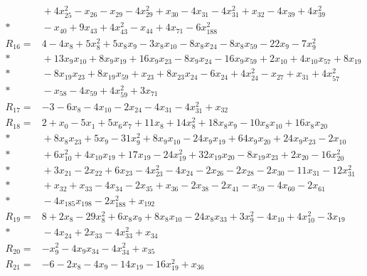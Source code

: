 \documentclass[11pt]{article}
\theoremstyle{remark}\newtheorem{remark}[theorem]{Remark}
\begin{document}
\begin{align*}
&{} + 4x_{25}^{2} - x_{26} - x_{29} - 4x_{29}^{2} + x_{30} - 4x_{31} - 4x_{31}^{2} + x_{32} - 4x_{39} + 4x_{39}^{2} \\*
&{} - x_{40} + 9x_{43} + 4x_{43}^{2} - x_{44} + 4x_{71} - 6x_{188}^{2} \\[4pt]
R_{16} ={}& 4 - 4x_{8} + 5x_{8}^{2} + 5x_{8}x_{9} - 3x_{8}x_{10} - 8x_{8}x_{24} - 8x_{8}x_{59} - 22x_{9} - 7x_{9}^{2} \\*
&{} + 13x_{9}x_{10} + 8x_{9}x_{19} + 16x_{9}x_{23} - 8x_{9}x_{24} - 16x_{9}x_{59} + 2x_{10} + 4x_{10}x_{57} + 8x_{19} \\*
&{} - 8x_{19}x_{23} + 8x_{19}x_{59} + x_{23} + 8x_{23}x_{24} - 6x_{24} + 4x_{24}^{2} - x_{27} + x_{31} + 4x_{57}^{2} \\*
&{} - x_{58} - 4x_{59} + 4x_{59}^{2} + 3x_{71} \\[4pt]
R_{17} ={}& -3 - 6x_{8} - 4x_{10} - 2x_{24} - 4x_{31} - 4x_{31}^{2} + x_{32} \\[4pt]
R_{18} ={}& 2 + x_{0} - 5x_{1} + 5x_{6}x_{7} + 11x_{8} + 14x_{8}^{2} + 18x_{8}x_{9} - 10x_{8}x_{10} + 16x_{8}x_{20} \\*
&{} + 8x_{8}x_{23} + 5x_{9} - 31x_{9}^{2} + 8x_{9}x_{10} - 24x_{9}x_{19} + 64x_{9}x_{20} + 24x_{9}x_{23} - 2x_{10} \\*
&{} + 6x_{10}^{2} + 4x_{10}x_{19} + 17x_{19} - 24x_{19}^{2} + 32x_{19}x_{20} - 8x_{19}x_{23} + 2x_{20} - 16x_{20}^{2} \\*
&{} + 3x_{21} - 2x_{22} + 6x_{23} - 4x_{23}^{2} - 4x_{24} - 2x_{26} - 2x_{28} - 2x_{30} - 11x_{31} - 12x_{31}^{2} \\*
&{} + x_{32} + x_{33} - 4x_{34} - 2x_{35} + x_{36} - 2x_{38} - 2x_{41} - x_{59} - 4x_{60} - 2x_{61} \\*
&{} - 4x_{185}x_{198} - 2x_{188}^{2} + x_{192} \\[4pt]
R_{19} ={}& 8 + 2x_{8} - 29x_{8}^{2} + 6x_{8}x_{9} + 8x_{8}x_{10} - 24x_{8}x_{33} + 3x_{9}^{2} - 4x_{10} + 4x_{10}^{2} - 3x_{19} \\*
&{} - 4x_{24} + 2x_{33} - 4x_{33}^{2} + x_{34} \\[4pt]
R_{20} ={}& -x_{9}^{2} - 4x_{9}x_{34} - 4x_{34}^{2} + x_{35} \\[4pt]
R_{21} ={}& -6 - 2x_{8} - 4x_{9} - 14x_{19} - 16x_{19}^{2} + x_{36} \\[4pt]

\end{align*}
\end{document}
